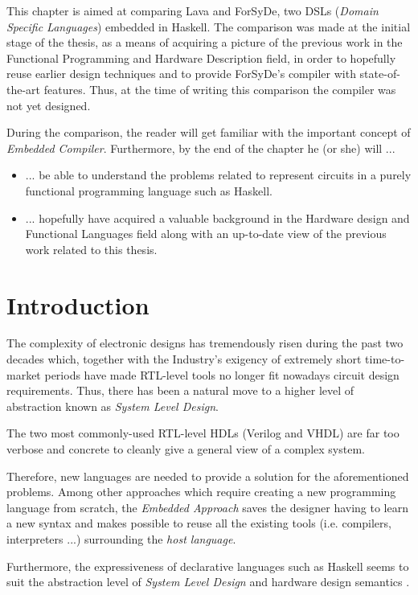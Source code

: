This chapter is aimed at comparing Lava and ForSyDe, two DSLs (\textit{Domain
  Specific Languages}) embedded in Haskell.  The comparison was made at the
initial stage of the thesis, as a means of acquiring a picture of the previous
work in the Functional Programming and Hardware Description field, in order to
hopefully reuse earlier design techniques and to provide ForSyDe's compiler
with state-of-the-art features. Thus, at the time of writing this comparison
the compiler was not yet designed.


  During the comparison, the reader will get familiar with the
  important concept of \textit{Embedded Compiler}. Furthermore, by the end
  of the chapter he (or she) will ...  

  \begin{itemize}
  \item  ... be able to understand the problems
    related to represent circuits in a purely functional programming
    language such as Haskell.
  \item ... hopefully have acquired a valuable background
    in the Hardware design and Functional Languages field along with
    an up-to-date view of the previous work related to this thesis.
  \end{itemize}

  \section{Introduction}
  The complexity of electronic designs has tremendously risen during the past
  two decades which, together with the Industry's exigency of extremely
  short time-to-market periods have made RTL-level tools no longer fit
  nowadays circuit design requirements. Thus, there has been a
  natural move to a higher level of abstraction known as
  \textit{System Level Design}.

  The two most commonly-used RTL-level HDLs (Verilog and VHDL) are far
  too verbose and concrete to cleanly give a general view of a
  complex system.

  Therefore, new languages are needed to provide a solution for the
  aforementioned problems.  Among other approaches which require
  creating a new programming language from scratch, the
  \textit{Embedded Approach} saves the designer having to learn a new
  syntax and makes possible to reuse all the existing tools (i.e.
  compilers, interpreters ...)  surrounding the \textit{host
    language}.

  Furthermore, the expressiveness of declarative languages such as
  Haskell seems to suit the abstraction level of \textit{System Level
    Design}  \cite{declarative} and hardware design semantics
   \cite{funhw}.

